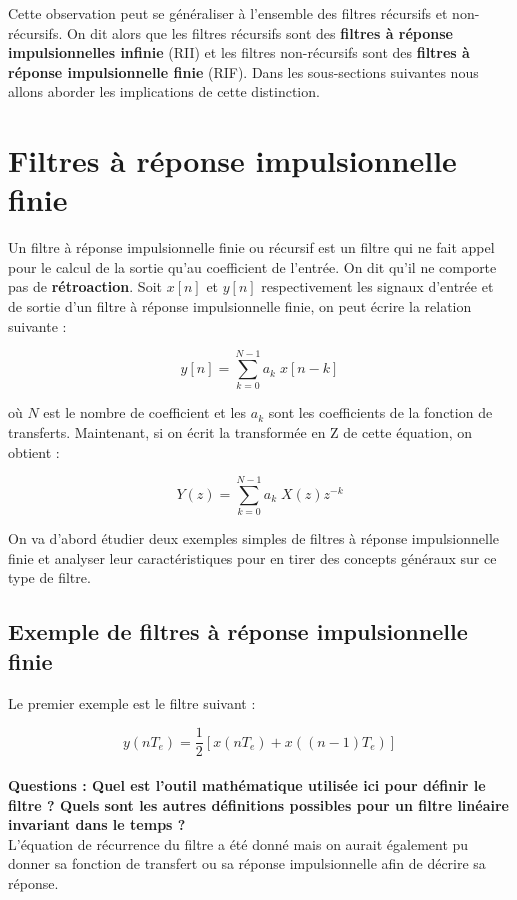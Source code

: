 \documentclass[11pt,a4paper]{article}
\begin{document}
Cette observation peut se généraliser à l'ensemble des filtres récursifs et non-récursifs. On dit alors que les filtres récursifs sont des \textbf{filtres à réponse impulsionnelles infinie} (RII) et les filtres non-récursifs sont des \textbf{filtres à réponse impulsionnelle finie} (RIF). Dans les sous-sections suivantes nous allons aborder les implications de cette distinction.

\section{Filtres à réponse impulsionnelle finie}
Un filtre à réponse impulsionnelle finie ou récursif est un filtre qui ne fait appel pour le calcul de la sortie qu'au coefficient de l'entrée. On dit qu'il ne comporte pas de \textbf{rétroaction}. Soit $x[n]$ et $y[n]$  respectivement les signaux d'entrée et de sortie d'un filtre à réponse impulsionnelle finie, on peut écrire la relation suivante : 

\[ y[n] =  \sum_{k = 0}^{N-1} a_k \; x[n-k]\] 

où $N$ est le nombre de coefficient et les $a_k$ sont les coefficients de la fonction de transferts. Maintenant, si on écrit la transformée en Z de cette équation, on obtient :

\[ Y(z) =  \sum_{k = 0}^{N-1} a_k \; X(z)z^{-k} \] 

On va d'abord étudier deux exemples simples de filtres à réponse impulsionnelle finie et analyser leur caractéristiques pour en tirer des concepts généraux sur ce type de filtre.

\subsection{Exemple de filtres à réponse impulsionnelle finie}
Le premier exemple est le filtre suivant : 

\[ y(nT_e) = \frac{1}{2}[x(nT_e) + x((n-1)T_e)  ] \]\\

\textbf{Questions : Quel est l'outil mathématique utilisée ici pour définir le filtre ? Quels sont les autres définitions possibles pour un filtre linéaire invariant dans le temps ?  }\\

L'équation de récurrence du filtre a été donné mais on aurait également pu donner sa fonction de transfert ou sa réponse impulsionnelle afin de décrire sa réponse.\\
\end{document}
